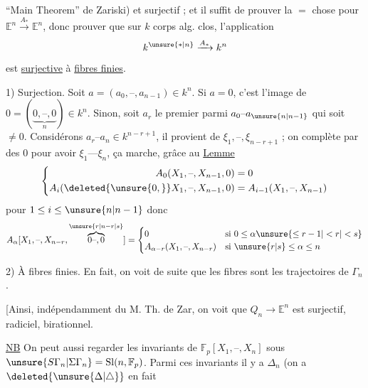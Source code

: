 ``Main Theorem'' de Zariski) et surjectif ; et il suffit de prouver la $=$ chose pour $\mathbb E^n\xrightarrow{A_*}\mathbb E^n$, donc prouver que sur $k$ corps alg. clos, l'application
\[ k^{\unsure{*|n}}\xrightarrow{A_*}k^n \]
est \uline{surjective} à \uline{fibres finies}.

1) Surjection. Soit $a=(a_0,\text{--},a_{n-1})\in k^n$. Si $a=0$, c'est l'image de $0=(\underbrace{0,\text{--},0}_{n})\in k^n$. 
Sinon, soit $a_r$ le premier parmi $a_0\text{--}a_{\unsure{n|n-1}}$ qui soit $\neq0$. Considérons $a_r\text{--}a_n\in k^{n-r+1}$, il provient de $\xi_1,\text{--},\xi_{n-r+1}$ ; on complète par des $0$ pour avoir $\xi_1\text{---}\xi_n$, ça marche, grâce au
\uline{Lemme} \[
\left\{\begin{aligned}
 A_0(X_1,\text{--},X_{n-1},0)&=0\\
 A_i(\deleted{\unsure{0,}}X_1,\text{--},X_{n-1},0)&=A_{i-1}(X_1,\text{--},X_{n-1})
\end{aligned}\right.
\]
pour $1\leq i\leq\unsure{n|n-1}$
donc
\[
 A_\alpha[X_1,\text{--},X_{n-r},\overbrace{0\text{--},0}^{\unsure{r|n-r|s}}]
 =\begin{cases}
 0&\text{si }0\leq\alpha\unsure{\leq r-1|<r|<s}\\
 A_{\alpha-r}(X_1,\text{--},X_{n-r})&\text{si }\unsure{r|s}\leq\alpha\leq n
 \end{cases}
\]

2) À fibres finies. En fait, on voit  de suite que les fibres sont les trajectoires de $\Gamma_n$.

[Ainsi, indépendamment du M. Th. de Zar, on voit que $Q_n\to\mathbb E^n$ est surjectif, radiciel, birationnel.

\uline{NB} On peut aussi regarder les invariants de $\mathbb F_p[X_1,\text{--},X_n]$ sous $\unsure{S\Gamma_n|\Sigma\Gamma_n}=\operatorname{Sl}(n,\mathbb F_p)$. Parmi ces invariants il y a $\Delta_n$ (on a $\deleted{\unsure{\Delta|\triangle}}$ en fait

